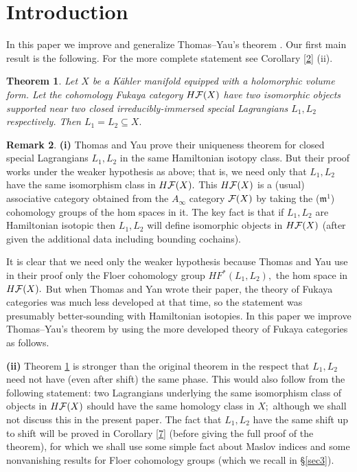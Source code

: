 \documentclass{article}
\theoremstyle{plain}%
\newtheorem{thm}{Theorem}[section]
\theoremstyle{definition}
\newtheorem{rem}[thm]{Remark}
\numberwithin{equation}{section}
\numberwithin{figure}{section}
\def\l{\label}
\def\fm{\mathfrak m}
\def\cF{{\mathbin{\cal F}}}
\def\iy{\infty}
\def\sb{\subseteq}
\begin{document}
\section{Introduction}
In this paper we improve and generalize Thomas--Yau's theorem \cite[Theorem 4.3]{TY}.
Our first main result is the following.
For the more complete statement see Corollary \ref{2} (ii).
\begin{thm}\l{01}
Let $X$ be a K\"ahler manifold equipped with a holomorphic volume form.
Let the cohomology Fukaya category $H\cF(X)$ have two isomorphic objects supported near two closed irreducibly-immersed special Lagrangians $L_1,L_2$ respectively.
Then $L_1=L_2\sb X.$
\end{thm}
\begin{rem}
{\bf(i)}
Thomas and Yau prove their uniqueness theorem for closed special Lagrangians $L_1,L_2$ in the same Hamiltonian isotopy class.
But their proof works under the weaker hypothesis as above; that is, we need only that $L_1,L_2$ have the same isomorphism class in $H\cF(X).$
This $H\cF(X)$ is a (usual) associative category obtained from the $A_\iy$ category $\cF(X)$ by taking the ($\fm^1$) cohomology groups of the hom spaces in it.
The key fact is that if $L_1,L_2$ are Hamiltonian isotopic then $L_1,L_2$ will define isomorphic objects in $H\cF(X)$ (after given the additional data including bounding cochains).

It is clear that we need only the weaker hypothesis because Thomas and Yau use in their proof only the Floer cohomology group $HF^*(L_1,L_2),$ the hom space in $H\cF(X).$
But when Thomas and Yan wrote their paper, the theory of Fukaya categories was much less developed at that time, so the statement was presumably better-sounding with Hamiltonian isotopies. 
In this paper we improve Thomas--Yau's theorem by using the more developed theory of Fukaya categories as follows.

{\bf(ii)}
Theorem \ref{01} is stronger than the original theorem in the respect that $L_1,L_2$ need not have (even after shift) the same phase. This would also follow from the following statement: two Lagrangians underlying the same isomorphism class of objects in $H\cF(X)$ should have the same homology class in $X;$ although we shall not discuss this in the present paper. 
The fact that $L_1,L_2$ have the same shift up to shift will be proved in Corollary \ref{7} (before giving the full proof of the theorem), for which we shall use some simple fact about Maslov indices and some nonvanishing results for Floer cohomology groups (which we recall in \S\ref{sec3}). 


\end{rem}
\end{document}
